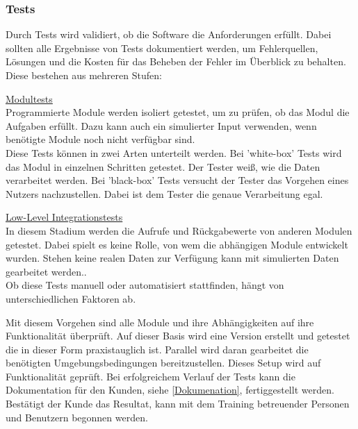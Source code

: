 \subsubsection{Tests}
\label{Tests}
Durch Tests wird validiert, ob die Software die Anforderungen erfüllt. Dabei sollten alle Ergebnisse von Tests dokumentiert werden, um Fehlerquellen, Lösungen und die Kosten für das Beheben der Fehler im Überblick zu behalten\cite{rakos1990software}.\\
Diese bestehen aus mehreren Stufen:
\begin{description}
\item{\underline{Modultests}}\hfill\\
Programmierte Module werden isoliert getestet, um zu prüfen, ob das Modul die Aufgaben erfüllt. Dazu kann auch ein simulierter Input verwenden, wenn benötigte Module noch nicht verfügbar sind. \\
Diese Tests können in zwei Arten unterteilt werden. Bei 'white-box' Tests wird das Modul in einzelnen Schritten getestet. Der Tester weiß, wie die Daten verarbeitet werden. Bei 'black-box' Tests versucht der Tester das Vorgehen eines Nutzers nachzustellen. Dabei ist dem Tester die genaue Verarbeitung egal\cite{rakos1990software}.
\item{\underline{Low-Level Integrationstests}}\hfill\\
In diesem Stadium werden die Aufrufe und Rückgabewerte von anderen Modulen getestet. Dabei spielt es keine Rolle, von wem die abhängigen Module entwickelt wurden. Stehen keine realen Daten zur Verfügung kann mit simulierten Daten gearbeitet werden.\cite{rakos1990software}.\\
Ob diese Tests manuell oder automatisiert stattfinden, hängt von unterschiedlichen Faktoren ab.
\end{description}
Mit diesem Vorgehen sind alle Module und ihre Abhängigkeiten auf ihre Funktionalität überprüft. Auf dieser Basis wird eine Version erstellt und getestet die in dieser Form praxistauglich ist. Parallel wird daran gearbeitet die benötigten Umgebungsbedingungen bereitzustellen. Dieses Setup wird auf Funktionalität geprüft. Bei erfolgreichem Verlauf der Tests kann die Dokumentation für den Kunden, siehe \ref{Dokumenation}, fertiggestellt werden.
Bestätigt der Kunde das Resultat, kann mit dem Training betreuender Personen und Benutzern begonnen werden\cite{rakos1990software}.\\
